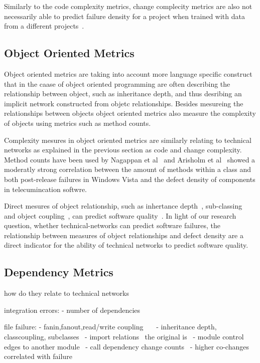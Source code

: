 Similarly to the code complexity metrics, change complecity metrics are also not necessarily able to predict failure density for a project when trained with data from a different projects~\cite{zimmermann:fse:2009}.


\subsection{Object Oriented Metrics}
Object oriented metrics are taking into account more language specific construct that in the caase of object oriented programming are often describing the relationship between object, such as inheritance depth, and thus desribing an implicit network constructed from objetc relationships.
Besides mesureing the relationships between objects object oriented metrics also measure the complexity of objects using metrics such as method counts.

Complexity mesures in object oriented metrics are similarly relating to technical networks as explained in the previous section as code and change complexity.
Method counts have been used by Nagappan et al~\cite{nagappan:icse:2006} and Arisholm et al~\cite{arisholm:isese:2006} showed a moderatly strong correlation between the amount of methods within a class and both post-release failures in Windows Vista and the defect density of components in telecumincation softwre.

Direct mesures of object relationship, such as inhertance depth~\cite{}, sub-classing~\cite{} and object coupling~\cite{}, can predict software quality~\cite{nagappan:icse:2006,arisholm:isese:2006,english:promise:2009}.
In light of our research question, whether technical-networks can predict software failures, the relationship between measures of object relationships and defect density are a direct indicator for the ability of technical networks to predict software quality.


\subsection{Dependency Metrics}
how do they relate to technical networks

integration errors:
- number of dependencies~\cite{cataldo:icse:2011}

file failure:
- fanin,fanout,read/write coupling~\cite{nagappan:icse:2006}~\cite{arisholm:isese:2006}~\cite{knab:msr:2006}
- inheritance depth, classcoupling, subclasses~\cite{nagappan:icse:2006}
- import relations~\cite{dualaekoko:esem:2009} the original is~\cite{schroeter:isese:2006}
- module control edges to another module~\cite{jiang:promise:2008}
- call dependency change counts~\cite{shin:msr:2009}
- higher co-changes correlated with failure~\cite{dambros:wcre:2009}

